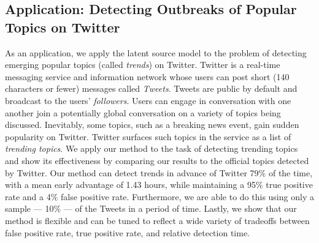 \subsection{Application: Detecting Outbreaks of Popular Topics on Twitter}
As an application, we apply the latent source model to the problem of detecting
emerging popular topics (called {\em trends}) on Twitter. Twitter is a real-time
messaging service and information network whose users can post short (140
characters or fewer) messages called {\em Tweets}. Tweets are public by default
and broadcast to the users' {\em followers}. Users can engage in conversation
with one another join a potentially global conversation on a variety of topics
being discussed. Inevitably, some topics, such as a breaking news event, gain
sudden popularity on Twitter. Twitter surfaces such topics in the service as a
list of {\em trending topics}. We apply our method to the task of detecting
trending topics and show its effectiveness by comparing our results to the
official topics detected by Twitter. Our method can detect trends in advance of
Twitter 79\% of the time, with a mean early advantage of 1.43 hours, while
maintaining a 95\% true positive rate and a 4\% false positive
rate. Furthermore, we are able to do this using only a sample --- 10\% --- of
the Tweets in a period of time. Lastly, we show that our method is flexible and
can be tuned to reflect a wide variety of tradeoffs between false positive rate,
true positive rate, and relative detection time.
